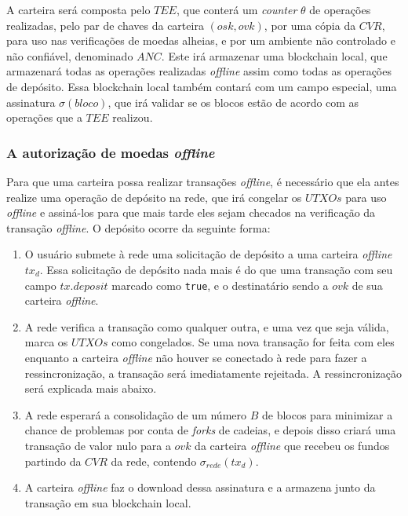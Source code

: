 \documentclass[
  12pt,
  a4paper,
  oneside,
  article,
]{abntex2}
\begin{document}
A carteira será composta pelo $TEE$, que conterá um \textit{counter} $\theta$ de operações realizadas, pelo par de chaves da carteira $(osk, ovk)$, por uma cópia da $CVR$, para uso nas verificações de moedas alheias, e por um ambiente não controlado e não confiável, denominado $ANC$. Este irá armazenar uma blockchain local, que armazenará todas as operações realizadas \textit{offline} assim como todas as operações de depósito. Essa blockchain local também contará com um campo especial, uma assinatura $\sigma(bloco)$, que irá validar se os blocos estão de acordo com as operações que a $TEE$ realizou.

\subsubsection{A autorização de moedas \textit{offline}}
Para que uma carteira possa realizar transações \textit{offline}, é necessário que ela antes realize uma operação de depósito na rede, que irá congelar os $UTXOs$ para uso \textit{offline} e assiná-los para que mais tarde eles sejam checados na verificação da transação \textit{offline}. O depósito ocorre da seguinte forma:

\begin{enumerate}
	\item O usuário submete à rede uma solicitação de depósito a uma carteira \textit{offline} $tx_d$. Essa solicitação de depósito nada mais é do que uma transação com seu campo $tx.deposit$ marcado como \texttt{true}, e o destinatário sendo a $ovk$ de sua carteira \textit{offline}.
	\item A rede verifica a transação como qualquer outra, e uma vez que seja válida, marca os $UTXOs$ como congelados. Se uma nova transação for feita com eles enquanto a carteira \textit{offline} não houver se conectado à rede para fazer a ressincronização, a transação será imediatamente rejeitada. A ressincronização será explicada mais abaixo.
	\item A rede esperará a consolidação de um número $B$ de blocos para minimizar a chance de problemas por conta de \textit{forks} de cadeias, e depois disso criará uma transação de valor nulo para a $ovk$ da carteira \textit{offline} que recebeu os fundos partindo da $CVR$ da rede, contendo $\sigma_{rede}(tx_d)$.
	\item A carteira \textit{offline} faz o download dessa assinatura e a armazena junto da transação em sua blockchain local.
\end{enumerate}
\end{document}
